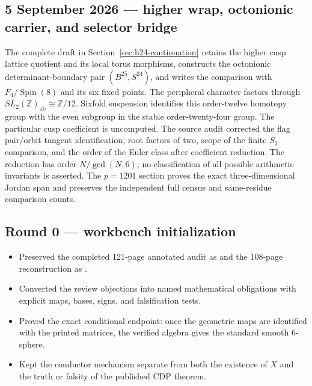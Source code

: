 \subsection*{5 September 2026 --- higher wrap, octonionic carrier, and selector bridge}
The complete draft in Section~\ref{sec:h24-continuation} retains the
higher cusp lattice quotient and its local torus morphisms, constructs
the octonionic determinant-boundary pair $(B^{25},S^{24})$, and writes
the comparison with $F_4/\operatorname{Spin}(8)$ and its six fixed points.
The peripheral character factors through $SL_2(\mathbb Z)_{\mathrm{ab}}
\cong\mathbb Z/12$. Sixfold suspension identifies this order-twelve
homotopy group with the even subgroup in the stable order-twenty-four
group. The particular cusp coefficient is uncomputed. The source audit
corrected the flag pair/orbit tangent identification, root factors of two,
scope of the finite $S_3$ comparison, and the order of the Euler class
after coefficient reduction. The reduction has order $N/\gcd(N,6)$;
no classification of all possible arithmetic invariants is asserted.
The $p=1201$ section proves the exact three-dimensional Jordan span and
preserves the independent full census and same-residue comparison counts.

\subsection*{Round 0 --- workbench initialization}

\begin{itemize}[leftmargin=1.8em]
\item Preserved the completed 121-page annotated audit as
and the 108-page reconstruction as
.
\item Converted the review objections into named mathematical obligations with explicit maps, bases, signs, and falsification tests.
\item Proved the exact conditional endpoint: once the geometric maps are identified with the printed matrices, the verified algebra gives the standard smooth $6$-sphere.
\item Kept the conductor mechanism separate from both the existence of $X$ and the truth or falsity of the published CDP theorem.
\end{itemize}


